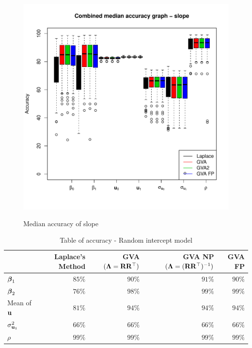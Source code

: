 \documentclass{amsart}[12pt]
\begin{document}
	\begin{figure}
		\caption{Median accuracy of slope}
		\label{fig:median_accuracy_slope}
		\includegraphics[width=120mm, height=120mm]{code/results/median_accuracy_combined_slope.pdf}
	\end{figure}
		
	\begin{table}
		\caption{Table of accuracy - Random intercept model}
		\label{tab:accuracy_int}
		\begin{tabular}{|l|rrrr|}
			\hline
			                   & Laplace's Method & GVA $({\boldsymbol \Lambda} = {\bf R} {\bf R}^\top)$ & GVA NP $({\boldsymbol \Lambda} = ({\bf R} {\bf R}^\top)^{-1})$ & GVA FP   \\
			\hline
			${\boldsymbol \beta}_1$         & $85\%$           & $90\%$                          & $91\%$                                    & $90\%$   \\ 
			${\boldsymbol \beta}_2$         & $76\%$           & $98\%$                          & $99\%$                                    & $99\%$   \\ 
			Mean of ${\bf u}$      & $81\%$           & $94\%$                          & $94\%$                                    & $94\%$   \\
			$\sigma^2_{{\bf u}_1}$ & $66\%$         & $66\%$                        & $66\%$                                  & $66\%$ \\ 
			$\rho$             & $99\%$           & $99\%$                          & $99\%$                                    & $99\%$   \\ 
			\hline
		\end{tabular}
	\end{table}
		
\end{document}
